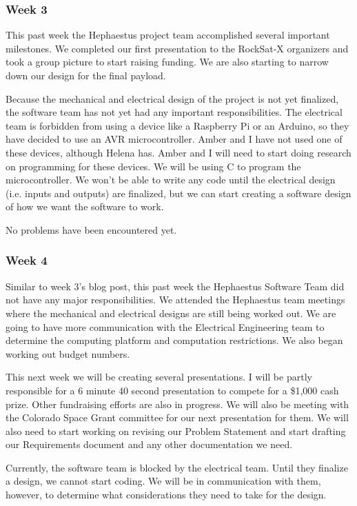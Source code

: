 \subsubsection{Week 3}
This past week the Hephaestus project team accomplished several important milestones. We completed our first presentation to the RockSat-X organizers and took a group picture to start raising funding. We are also starting to narrow down our design for the final payload.

Because the mechanical and electrical design of the project is not yet finalized, the software team has not yet had any important responsibilities. The electrical team is forbidden from using a device like a Raspberry Pi or an Arduino, so they have decided to use an AVR microcontroller. Amber and I have not used one of these devices, although Helena has. Amber and I will need to start doing research on programming for these devices. We will be using C to program the microcontroller. We won't be able to write any code until the electrical design (i.e. inputs and outputs) are finalized, but we can start creating a software design of how we want the software to work.

No problems have been encountered yet.

\subsubsection{Week 4}
Similar to week 3's blog post, this past week the Hephaestus Software Team did not have any major responsibilities. We attended the Hephaestus team meetings where the mechanical and electrical designs are still being worked out. We are going to have more communication with the Electrical Engineering team to determine the computing platform and computation restrictions. We also began working out budget numbers.

This next week we will be creating several presentations. I will be partly responsible for a 6 minute 40 second presentation to compete for a \$1,000 cash prize. Other fundraising efforts are also in progress. We will also be meeting with the Colorado Space Grant committee for our next presentation for them. We will also need to start working on revising our Problem Statement and start drafting our Requirements document and any other documentation we need.

Currently, the software team is blocked by the electrical team. Until they finalize a design, we cannot start coding. We will be in communication with them, however, to determine what considerations they need to take for the design.

